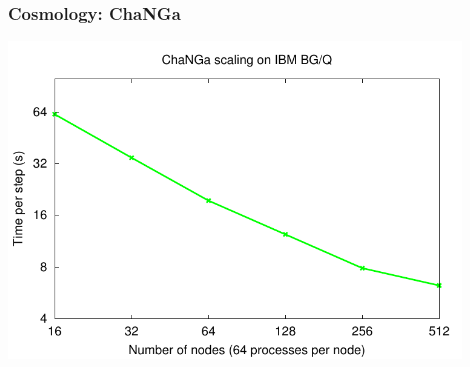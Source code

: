 \begin{frame}
\frametitle{Cosmology: ChaNGa}
\begin{center}
\includegraphics[width=0.9\textwidth]{../figures/changa-scaling.pdf}
\end{center}
\end{frame}


